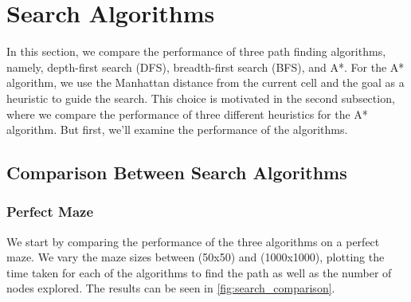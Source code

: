 \documentclass{article}
\begin{document}
\section{Search Algorithms}

In this section, we compare the performance of three path finding algorithms, namely, depth-first search (DFS), breadth-first search (BFS), and A*.  For the A* algorithm, we use the Manhattan distance from the current cell and the goal as a heuristic to guide the search. This choice is motivated in the second subsection, where we compare the performance of three different heuristics for the A* algorithm. But first, we'll examine the performance of the algorithms. 

\subsection{Comparison Between Search Algorithms}
\subsubsection{Perfect Maze}
We start by comparing the performance of the three algorithms on a perfect maze. We vary the maze sizes between (50x50) and (1000x1000), plotting the time taken for each of the algorithms to find the path as well as the number of nodes explored. The results can be seen in \autoref{fig:search_comparison}.
\end{document}
